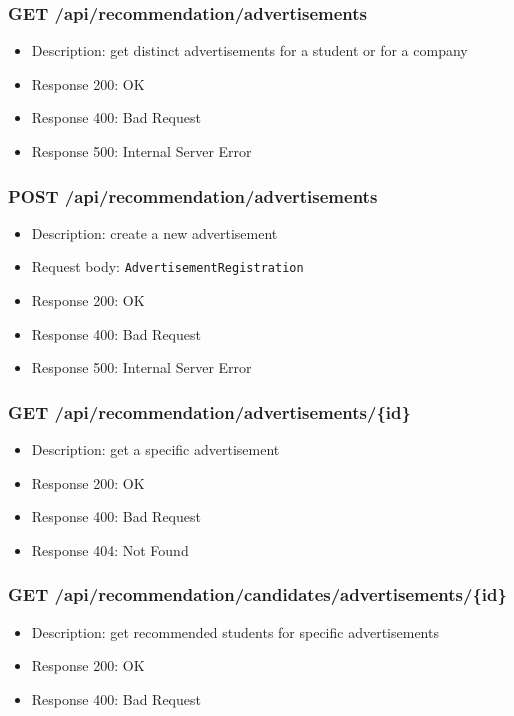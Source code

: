 \subsubsection{GET /api/recommendation/advertisements}
\begin{itemize}
    \item Description: get distinct advertisements for a student or for a company
    \item Response 200: OK
    \item Response 400: Bad Request
    \item Response 500: Internal Server Error
\end{itemize}

\subsubsection{POST /api/recommendation/advertisements}
\begin{itemize}
    \item Description: create a new advertisement
    \item Request body: \verb|AdvertisementRegistration|
    \item Response 200: OK
    \item Response 400: Bad Request
    \item Response 500: Internal Server Error
\end{itemize}

\subsubsection{GET /api/recommendation/advertisements/\{id\}}
\begin{itemize}
    \item Description: get a specific advertisement
    \item Response 200: OK
    \item Response 400: Bad Request
    \item Response 404: Not Found
\end{itemize}

\subsubsection{GET /api/recommendation/candidates/advertisements/\{id\}}
\begin{itemize}
    \item Description: get recommended students for specific advertisements
    \item Response 200: OK
    \item Response 400: Bad Request
\end{itemize}

